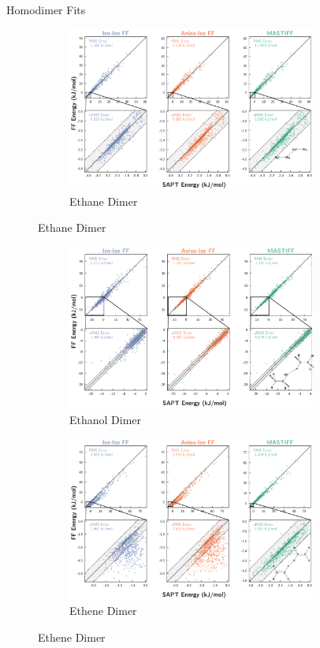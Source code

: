 \begin{section}{Homodimer Fits}
\begin{figure}
\begin{subfigure}{\textwidth}
    \end{subfigure}
    \begin{subfigure}{\textwidth}
        \caption{Ethane Dimer}
        \includegraphics[width=0.9\textwidth]{anisotropic/si/homodimer_figures/ethane_ethane_comparison.pdf}
    \end{subfigure}
    \end{figure}
    \begin{figure}
    \ContinuedFloat
    \begin{subfigure}{\textwidth}
        \caption{Ethanol Dimer}
        \includegraphics[width=0.9\textwidth]{anisotropic/si/homodimer_figures/ethanol_ethanol_comparison.pdf}
    \end{subfigure}
    \begin{subfigure}{\textwidth}
        \caption{Ethene Dimer}
        \includegraphics[width=0.9\textwidth]{anisotropic/si/homodimer_figures/ethene_ethene_comparison.pdf}

\end{subfigure}
\end{figure}
\end{section}
